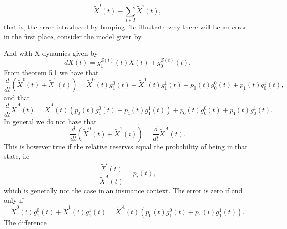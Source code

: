 \documentclass[12pt]{article}
\newcommand{\noin}{\noindent}
\theoremstyle{my_thm}
\begin{document}
$$
\tilde{X}^I(t) - \sum_{i \in I} \tilde{X}^i(t),
$$
that is, the error introduced by lumping.
To illustrate why there will be an error in the first place, consider the model given by
\def\sca{3.5}
\def\scaa{0.9}
\begin{figure}[H]
\begin{center}
\end{center}
\end{figure}
\noin And with X-dynamics given by
$$
dX(t)=g^{Z(t)}_1(t)X(t)+g^{Z(t)}_0(t).
$$
From theorem 5.1 we have that
$$
\frac{d}{dt}(\tilde{X}^0(t)+\tilde{X}^1(t))=\tilde{X}^0(t)g_1^0(t)+\tilde{X}^1(t)g_1^1(t)+p_0(t)g_0^0(t)+p_1(t)g_0^1(t),
$$
and that
$$
\frac{d}{dt}\tilde{X}^A(t)=\tilde{X}^A(t)\left( p_0(t)g_1^0(t)+p_1(t)g_1^1(t) \right) + p_0(t)g_0^0(t)+p_1(t)g_0^1(t).
$$
In general we do not have that 
$$
\frac{d}{dt}(\tilde{X}^0(t)+\tilde{X}^1(t)) =  \frac{d}{dt}\tilde{X}^A(t).
$$
This is however true if the relative reserves equal the probability of being in that state, i.e 
$$
\frac{\tilde{X}^i(t)}{\tilde{X}^A(t)}=p_i(t)
,
$$
which is generally not the case in an insurance context. The error is zero if and only if
$$
\tilde{X}^0(t)g_1^0(t)+\tilde{X}^1(t)g_1^1(t)=\tilde{X}^A(t)\left( p_0(t)g_1^0(t)+p_1(t)g_1^1(t) \right).
$$
The difference 
\end{document}
